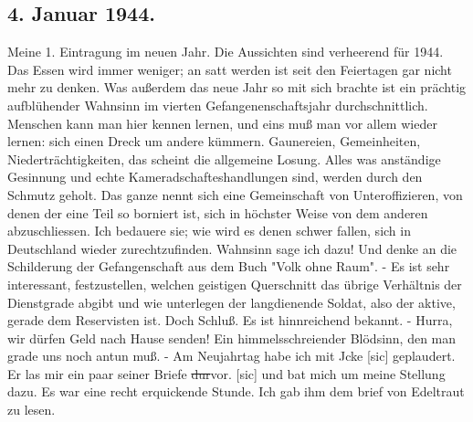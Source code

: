 \subsection{4. Januar 1944.}

Meine 1. Eintragung im neuen Jahr.
Die Aussichten sind verheerend f\"{u}r 1944.
Das Essen wird immer weniger; an satt werden ist seit den Feiertagen gar nicht mehr zu denken.
Was au{\ss}erdem das neue Jahr so mit sich brachte ist ein pr\"{a}chtig aufbl\"{u}hender Wahnsinn im vierten Gefangenenschaftsjahr durchschnittlich.
Menschen kann man hier kennen lernen, und eins mu{\ss} man vor allem wieder lernen: sich einen Dreck um andere k\"{u}mmern.
Gaunereien, Gemeinheiten, Niedertr\"{a}chtigkeiten, das scheint die allgemeine Losung.
Alles was anst\"{a}ndige Gesinnung und echte Kameradschafteshandlungen sind, werden durch den Schmutz geholt.
Das ganze nennt sich eine Gemeinschaft von Unteroffizieren, von denen der eine Teil so borniert ist, sich in h\"{o}chster Weise von dem anderen abzuschliessen.
Ich bedauere sie; wie wird es denen schwer fallen, sich in Deutschland wieder zurechtzufinden.
Wahnsinn sage ich dazu!
Und denke an die Schilderung der Gefangenschaft aus dem Buch "Volk ohne Raum".
- Es ist sehr interessant, festzustellen, welchen geistigen Querschnitt das \"{u}brige Verh\"{a}ltnis der Dienstgrade abgibt und wie unterlegen der langdienende Soldat, also der aktive, gerade dem Reservisten ist.
Doch Schlu{\ss}.
Es ist hinnreichend bekannt.
- Hurra, wir d\"{u}rfen Geld nach Hause senden!
Ein himmelsschreiender Bl\"{o}dsinn, den man grade uns noch antun mu{\ss}.
- Am Neujahrtag habe ich mit Jcke{\color{red} [sic] } geplaudert.
Er las mir ein paar seiner Briefe \st{dur}vor.{\color{red} [sic] } und bat mich um meine Stellung dazu.
Es war eine recht erquickende Stunde.
Ich gab ihm dem brief von Edeltraut zu lesen.

\clearpage
